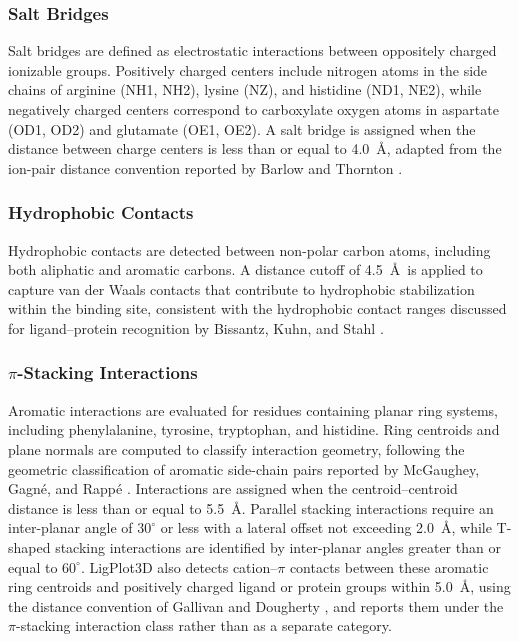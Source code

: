 \documentclass[lettersize,journal]{IEEEtran}
\begin{document}
\subsubsection{Salt Bridges}
Salt bridges are defined as electrostatic interactions between oppositely charged ionizable groups. Positively charged centers include nitrogen atoms in the side chains of arginine (NH1, NH2), lysine (NZ), and histidine (ND1, NE2), while negatively charged centers correspond to carboxylate oxygen atoms in aspartate (OD1, OD2) and glutamate (OE1, OE2). A salt bridge is assigned when the distance between charge centers is less than or equal to 4.0~\AA, adapted from the ion-pair distance convention reported by Barlow and Thornton \cite{barlowthornton1983saltbridge}.

\subsubsection{Hydrophobic Contacts}
Hydrophobic contacts are detected between non-polar carbon atoms, including both aliphatic and aromatic carbons. A distance cutoff of 4.5~\AA\ is applied to capture van der Waals contacts that contribute to hydrophobic stabilization within the binding site, consistent with the hydrophobic contact ranges discussed for ligand--protein recognition by Bissantz, Kuhn, and Stahl \cite{bissantz2010medchem}.

\subsubsection{\texorpdfstring{$\pi$}{π}-Stacking Interactions}
Aromatic interactions are evaluated for residues containing planar ring systems, including phenylalanine, tyrosine, tryptophan, and histidine. Ring centroids and plane normals are computed to classify interaction geometry, following the geometric classification of aromatic side-chain pairs reported by McGaughey, Gagn\'e, and Rapp\'e \cite{mcgaughey1998pistacking}. Interactions are assigned when the centroid–centroid distance is less than or equal to 5.5~\AA. Parallel stacking interactions require an inter-planar angle of $30^{\circ}$ or less with a lateral offset not exceeding 2.0~\AA, while T-shaped stacking interactions are identified by inter-planar angles greater than or equal to $60^{\circ}$. LigPlot3D also detects cation–$\pi$ contacts between these aromatic ring centroids and positively charged ligand or protein groups within 5.0~\AA, using the distance convention of Gallivan and Dougherty \cite{gallivandougherty1999cationpi}, and reports them under the $\pi$-stacking interaction class rather than as a separate category.
\end{document}
